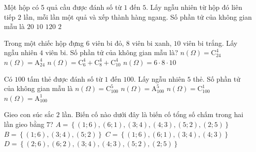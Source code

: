 \begin{ex}%
	Một hộp có 5 quả cầu được đánh số từ $ 1 $ đến $ 5 $. Lấy ngẫu nhiên từ hộp đó liên tiếp $ 2 $ lần,  mỗi lần một quả và xếp thành hàng ngang. Số phần tử của không gian mẫu là
	 \choice
		{\True $ 20 $} 
		{$ 10  $}
		{$ 120 $} 
		{$  2 $}
\end{ex}

\begin{ex}%
	Trong một chiếc hộp đựng $6$ viên bi đỏ, $8$ viên bi xanh, $10$  viên bi trắng. Lấy ngẫu nhiên $4$ viên bi.
	Số phần  tử của không gian mẫu là?
	 \choice
		 {\True $n(\Omega)=\mathrm{C}_{24}^4$}
		 {$n(\Omega)=\mathrm{A}_{24}^4$}
		 {$n(\Omega)=\mathrm{C}_6^4+\mathrm{C}_8^4+\mathrm{C}_{10}^4$}
		{$n(\Omega)=6\cdot 8\cdot  10$}
\end{ex}

\begin{ex}%
	Có $100$ tấm thẻ được đánh số từ  $1$ đến $100$. Lấy ngẫu nhiên $5$ thẻ. Số phần tử của không gian mẫu
	 là
	\choice 
		 {\True $n(\Omega)=\mathrm{C}_{100}^5$}
		{$n(\Omega)=\mathrm{A}_{100}^5$} 
		 {$n(\Omega)=\mathrm{C}_{100}^1$}
		{$n(\Omega)=\mathrm{A}_{100}^1$} 
\end{ex}

\begin{ex}%
	Gieo con súc sắc $2$ lần. Biến cố nào dưới  đây là biến cố tổng số chấm trong hai lần gieo bằng $7$?
	\choice 
		 {\True $A=\left\{(1;6),(6;1),(3;4),(4;3),(5;2),(2;5)\right\}$}
		{$B=\left\{(1;6),(3;4),(5;2)\right\}$} 
		 {$C=\left\{(1;6),(6;1),(3;4),(4;3)\right\}$}
		{$D=\left\{(2;6),(6;2),(3;4),(4;3),(5;2),(2;5)\right\}$} 
\end{ex}

